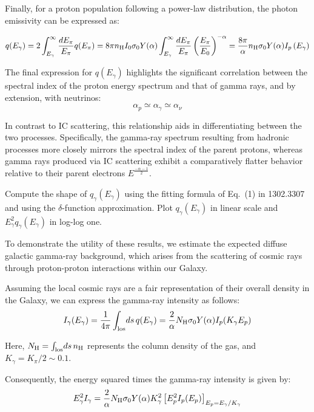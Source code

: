 Finally, for a proton population following a power-law distribution, the photon emissivity can be expressed as:
%
\begin{remark}
\[
q(E_\gamma) = 2 \int_{E_\gamma}^\infty \frac{dE_\pi}{E_\pi} q(E_\pi) = 
8 \pi n_{\rm H} I_0 \sigma_0 Y(\alpha) \int_{E_\gamma}^\infty \frac{dE_\pi}{E_\pi}  \left(\frac{E_\pi}{E_0} \right)^{-\alpha}
= \frac{8 \pi}{\alpha} n_{\rm H}  \sigma_0 Y(\alpha) I_p\left(E_\gamma \right)
\]
\end{remark}

The final expression for \( q(E_\gamma) \) highlights the significant correlation between the spectral index of the proton energy spectrum and that of gamma rays, and by extension, with neutrinos:
%
\[
\alpha_p \simeq \alpha_\gamma \simeq \alpha_\nu
\]

In contrast to IC scattering, this relationship aids in differentiating between the two processes. Specifically, the gamma-ray spectrum resulting from hadronic processes more closely mirrors the spectral index of the parent protons, whereas gamma rays produced via IC scattering exhibit a comparatively flatter behavior relative to their parent electrons $E^{\frac{-\alpha-1}{2}}$.

\begin{problem}
Compute the shape of $q_\gamma(E_\gamma)$ using the fitting formula of Eq.~(1) in 1302.3307 and using the $\delta$-function approximation. Plot $q_\gamma(E_\gamma)$ in linear scale and $E_\gamma^2q_\gamma(E_\gamma)$ in log-log one. 
\end{problem}

To demonstrate the utility of these results, we estimate the expected diffuse galactic gamma-ray background, which arises from the scattering of cosmic rays through proton-proton interactions within our Galaxy.

Assuming the local cosmic rays are a fair representation of their overall density in the Galaxy, we can express the gamma-ray intensity as follows:
%
\[
I_\gamma(E_\gamma) = \frac{1}{4\pi} \int_{\rm los} \! ds \, q(E_\gamma) = \frac{2}{\alpha} N_{\rm H} \sigma_0 Y(\alpha) I_p(K_\gamma E_p) 
\]

Here, \( N_{\rm H} = \int_{\rm los} \! ds \, n_{\rm H} \) represents the column density of the gas, and \( K_\gamma = K_\pi / 2 \sim 0.1 \).

Consequently, the energy squared times the gamma-ray intensity is given by:
%
\[
E_\gamma^2 I_\gamma = \frac{2}{\alpha} N_{\rm H} \sigma_0 Y(\alpha) K_\gamma^2 \left[ E_p^2 I_p(E_p) \right]_{E_p = E_\gamma / K_\gamma}
\]

